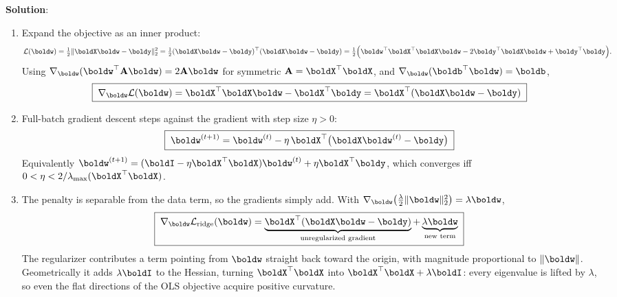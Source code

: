 \documentclass[submit]{../harvardml}
\newenvironment{solution}{
    \vspace{2mm}
    \color{blue}\noindent\textbf{Solution}:
}{}
\begin{document}
\begin{solution}
\begin{enumerate}

\item
Expand the objective as an inner product:
\[
  \mathcal L(\boldw) = \tfrac12\|\boldX\boldw - \boldy\|_2^2
  = \tfrac12(\boldX\boldw-\boldy)^\top(\boldX\boldw-\boldy)
  = \tfrac12\Big(\boldw^\top\boldX^\top\boldX\boldw - 2\boldy^\top\boldX\boldw + \boldy^\top\boldy\Big).
\]
Using $\nabla_{\boldw}(\boldw^\top \mathbf A\boldw) = 2\mathbf A\boldw$ for symmetric
$\mathbf A = \boldX^\top\boldX$, and $\nabla_{\boldw}(\boldb^\top\boldw) = \boldb$,
\[
  \boxed{\;\nabla_{\boldw}\mathcal L(\boldw) = \boldX^\top\boldX\boldw - \boldX^\top\boldy
   = \boldX^\top(\boldX\boldw - \boldy)\;}
\]

\item
Full-batch gradient descent steps against the gradient with step size $\eta > 0$:
\[
  \boxed{\;\boldw^{(t+1)} = \boldw^{(t)} - \eta\,\boldX^\top\big(\boldX\boldw^{(t)} - \boldy\big)\;}
\]
Equivalently $\boldw^{(t+1)} = (\boldI - \eta\boldX^\top\boldX)\boldw^{(t)} + \eta\boldX^\top\boldy$,
which converges iff $0 < \eta < 2/\lambda_{\max}(\boldX^\top\boldX)$.

\item
The penalty is separable from the data term, so the gradients simply add. With
$\nabla_{\boldw}\big(\tfrac{\lambda}{2}\|\boldw\|_2^2\big) = \lambda\boldw$,
\[
  \boxed{\;\nabla_{\boldw}\mathcal L_{\text{ridge}}(\boldw)
   = \underbrace{\boldX^\top(\boldX\boldw-\boldy)}_{\text{unregularized gradient}} + \underbrace{\lambda\boldw}_{\text{new term}}\;}
\]
The regularizer contributes a term pointing from $\boldw$ straight back toward the
origin, with magnitude proportional to $\|\boldw\|$. Geometrically it adds
$\lambda\boldI$ to the Hessian, turning $\boldX^\top\boldX$ into
$\boldX^\top\boldX + \lambda\boldI$: every eigenvalue is lifted by $\lambda$, so even
the flat directions of the OLS objective acquire positive curvature.


\end{enumerate}
\end{solution}
\end{document}
